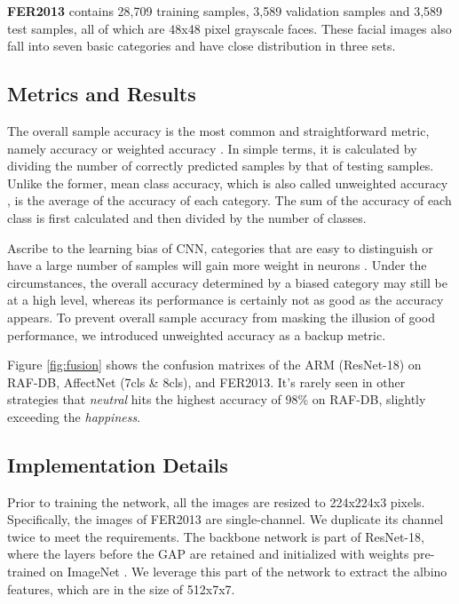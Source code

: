 \documentclass[10pt,twocolumn,letterpaper]{article}
\begin{document}
	\textbf{FER2013} \cite{fer2013} contains 28,709 training samples, 3,589 validation samples and 3,589 test samples, all of which are 48x48 pixel grayscale faces. These facial images also fall into seven basic categories and have close distribution in three sets. 


\subsection{Metrics and Results}
	The overall sample accuracy is the most common and straightforward metric, namely accuracy or weighted accuracy \cite{psr}. In simple terms, it is calculated by dividing the number of correctly predicted samples by that of testing samples. Unlike the former, mean class accuracy, which is also called unweighted accuracy \cite{psr}, is the average of the accuracy of each category. The sum of the accuracy of each class is first calculated and then divided by the number of classes. 

	Ascribe to the learning bias of CNN, categories that are easy to distinguish or have a large number of samples will gain more weight in neurons \cite{imbalance}. Under the circumstances, the overall accuracy determined by a biased category may still be at a high level, whereas its performance is certainly not as good as the accuracy appears. To prevent overall sample accuracy from masking the illusion of good performance, we introduced unweighted accuracy as a backup metric.

	Figure \ref{fig:fusion} shows the confusion matrixes of the ARM (ResNet-18) on RAF-DB, AffectNet (7cls \& 8cls), and FER2013. It's rarely seen in other strategies that \emph{neutral} hits the highest accuracy of 98\% on RAF-DB, slightly exceeding the \emph{happiness}.
	
	



\subsection{Implementation Details}
	Prior to training the network, all the images are resized to 224x224x3 pixels. Specifically, the images of FER2013 are single-channel. We duplicate its channel twice to meet the requirements. The backbone network is part of ResNet-18, where the layers before the GAP are retained and initialized with weights pre-trained on ImageNet \cite{imagenet}. We leverage this part of the network to extract the albino features, which are in the size of 512x7x7. 
\end{document}

